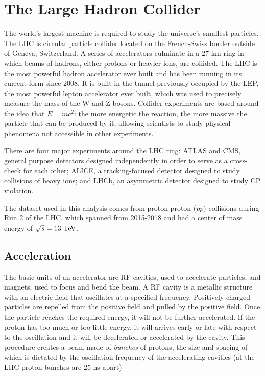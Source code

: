 \chapter{The Large Hadron Collider \label{chap:LHC}}

The world's largest machine is required to study the universe's smallest particles. The \ac{LHC} is circular particle collider located on the French-Swiss border outside of Geneva, Switzerland. A series of accelerators culminate in a $27$-km ring in which beams of hadrons, either protons or heavier ions, are collided. The \ac{LHC} is the most powerful hadron accelerator ever built and has been running in its current form since 2008. It is built in the tunnel previously occupied by the \ac{LEP}, the most powerful lepton accelerator ever built, which was used to precisely measure the mass of the W and Z bosons. Collider experiments are based around the idea that $E=mc^2$: the more energetic the reaction, the more massive the particle that can be produced by it, allowing scientists to study physical phenomena not accessible in other experiments. 

There are four major experiments around the \ac{LHC} ring: \ac{ATLAS} and \ac{CMS}, general purpose detectors designed independently in order to serve as a cross-check for each other; \ac{ALICE}, a tracking-focused detector designed to study collisions of heavy ions; and \ac{LHCb}, an asymmetric detector designed to study \ac{CP} violation. 

The dataset used in this analysis comes from proton-proton ($pp$) collisions during Run 2 of the \ac{LHC}, which spanned from 2015-2018 and had a center of mass energy of $\sqrt{s} = 13 \TeV$.


\section{Acceleration}
The basic units of an accelerator are \ac{RF} cavities, used to accelerate particles, and magnets, used to focus and bend the beam. A \ac{RF} cavity is a metallic structure with an electric field that oscillates at a specified frequency. Positively charged particles are repelled from the positive field and pulled by the positive field. Once the particle reaches the required energy, it will not be further accelerated. If the proton has too much or too little energy, it will arrives early or late with respect to the oscillation and it will be decelerated or accelerated by the cavity. This procedure creates a beam made of \emph{bunches} of protons, the size and spacing of which is dictated by the oscillation frequency of the accelerating cavities (at the \ac{LHC} proton bunches are $25$ ns apart)

